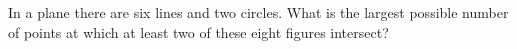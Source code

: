 In a plane there are six lines and two circles. What is the largest possible number of points at which at least two of these eight figures intersect?
